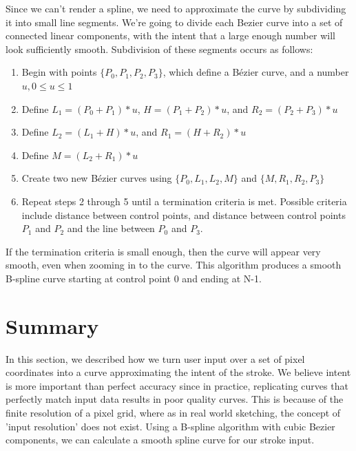 \documentclass[12pt]{report}
\begin{document}
Since we can't render a spline, we need to approximate the curve by subdividing it into small line segments.
We're going to divide each Bezier curve into a set of connected linear components, with the intent that a large enough number will look sufficiently smooth.
Subdivision of these segments occurs as follows:
\begin{enumerate}
\item Begin with points $\{P_0,P_1,P_2,P_3\}$, which define a Bézier curve, and a number $u, 0 \le u \le 1$
\item Define $L_1=(P_0 + P_1)*u$, $H=(P_1 + P_2)*u$, and $R_2=(P_2 + P_3)*u$
\item Define $L_2=(L_1 + H)*u$, and $R_1=(H + R_2)*u$
\item Define $M=(L_2 + R_1)*u$
\item Create two new Bézier curves using $\{P_0,L_1,L_2,M\}$ and $\{M,R_1,R_2,P_3\}$
\item Repeat steps 2 through 5 until a termination criteria is met. Possible criteria include distance between control points, and distance between control points $P_1$ and $P_2$ and the line between $P_0$ and $P_3$.
\end{enumerate}
If the termination criteria is small enough, then the curve will appear very smooth, even when zooming in to the curve.
This algorithm produces a smooth B-spline curve starting at control point 0 and ending at N-1.

\section{Summary}
In this section, we described how we turn user input over a set of pixel coordinates into a curve approximating the intent of the stroke.
We believe intent is more important than perfect accuracy since in practice, replicating curves that perfectly match input data results in poor quality curves.
This is because of the finite resolution of a pixel grid, where as in real world sketching, the concept of 'input resolution' does not exist.
Using a B-spline algorithm with cubic Bezier components, we can calculate a smooth spline curve for our stroke input.
\end{document}

